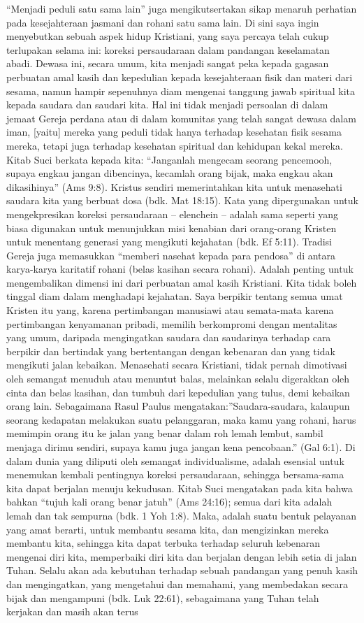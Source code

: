 ``Menjadi peduli satu sama lain'' juga mengikutsertakan sikap menaruh perhatian pada kesejahteraan jasmani dan rohani satu sama lain. Di sini saya ingin menyebutkan sebuah aspek hidup Kristiani, yang saya percaya telah cukup terlupakan selama ini: koreksi persaudaraan dalam pandangan keselamatan abadi. Dewasa ini, secara umum, kita menjadi sangat peka kepada gagasan perbuatan amal kasih dan kepedulian kepada kesejahteraan fisik dan materi dari sesama, namun hampir sepenuhnya diam mengenai tanggung jawab spiritual kita kepada saudara dan saudari kita. Hal ini tidak menjadi persoalan di dalam jemaat Gereja perdana atau di dalam komunitas yang telah sangat dewasa dalam iman, [yaitu] mereka yang peduli tidak hanya terhadap kesehatan fisik sesama mereka, tetapi juga terhadap kesehatan spiritual dan kehidupan kekal mereka. Kitab Suci berkata kepada kita: ``Janganlah mengecam seorang pencemooh, supaya engkau jangan dibencinya, kecamlah orang bijak, maka engkau akan dikasihinya'' (Ams 9:8). Kristus sendiri memerintahkan kita untuk menasehati saudara kita yang berbuat dosa (bdk. Mat 18:15). Kata yang dipergunakan untuk mengekpresikan koreksi persaudaraan – elenchein – adalah sama seperti yang biasa digunakan untuk menunjukkan misi kenabian dari orang-orang Kristen untuk menentang generasi yang mengikuti kejahatan (bdk. Ef 5:11). Tradisi Gereja juga memasukkan ``memberi nasehat kepada para pendosa'' di antara karya-karya karitatif rohani (belas kasihan secara rohani). Adalah penting untuk mengembalikan dimensi ini dari perbuatan amal kasih Kristiani. Kita tidak boleh tinggal diam dalam menghadapi kejahatan. Saya berpikir tentang semua umat Kristen itu yang,  karena pertimbangan manusiawi atau semata-mata karena pertimbangan kenyamanan pribadi, memilih berkompromi dengan mentalitas yang umum, daripada mengingatkan saudara dan saudarinya terhadap cara berpikir dan bertindak yang bertentangan dengan kebenaran dan yang tidak mengikuti jalan kebaikan. Menasehati secara Kristiani, tidak pernah dimotivasi oleh semangat menuduh atau menuntut balas, melainkan selalu digerakkan oleh cinta dan belas kasihan, dan tumbuh dari kepedulian yang tulus, demi kebaikan orang lain. Sebagaimana Rasul Paulus mengatakan:''Saudara-saudara, kalaupun seorang kedapatan melakukan suatu pelanggaran, maka kamu yang rohani, harus memimpin orang itu ke jalan yang benar dalam roh lemah lembut, sambil menjaga dirimu sendiri, supaya kamu juga jangan kena pencobaan.'' (Gal 6:1). Di dalam dunia yang diliputi oleh semangat individualisme, adalah esensial untuk menemukan kembali pentingnya koreksi persaudaraan, sehingga bersama-sama kita dapat berjalan menuju kekudusan. Kitab Suci mengatakan pada kita bahwa  bahkan ``tujuh kali orang benar jatuh'' (Ams 24:16); semua dari kita adalah lemah dan tak sempurna (bdk. 1 Yoh 1:8). Maka, adalah suatu bentuk pelayanan yang amat berarti, untuk membantu sesama kita, dan mengizinkan mereka membantu kita, sehingga kita dapat terbuka terhadap seluruh kebenaran mengenai diri kita, memperbaiki diri kita dan berjalan dengan lebih setia di jalan Tuhan. Selalu akan ada kebutuhan terhadap sebuah pandangan yang penuh kasih dan mengingatkan, yang mengetahui dan memahami, yang membedakan secara bijak dan mengampuni (bdk. Luk 22:61), sebagaimana yang Tuhan telah kerjakan dan masih akan terus 